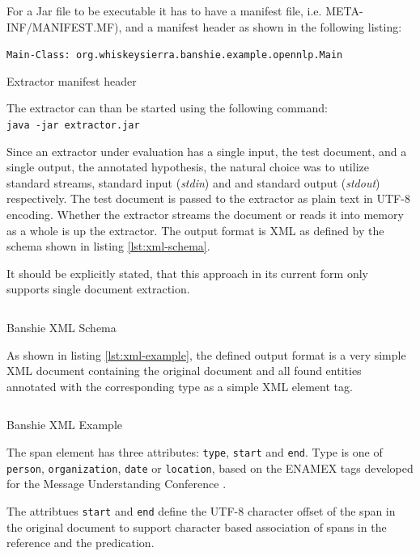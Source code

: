 For a Jar file to be executable it has to have a manifest file, i.e. META-INF/MANIFEST.MF), and a manifest header as shown in the following listing:

\begin{listing}[H]
\texttt{Main-Class: org.whiskeysierra.banshie.example.opennlp.Main}
\caption{Extractor manifest header}
\end{listing}

The extractor can than be started using the following command: \\ \texttt{java -jar extractor.jar}

Since an extractor under evaluation has a single input, the test document, and a single output, the annotated hypothesis, the natural choice was to utilize standard streams, standard input (\textit{stdin}) and and standard output (\textit{stdout}) respectively. The test document is passed to the extractor as plain text in UTF-8 encoding. Whether the extractor streams the document or reads it into memory as a whole is up the extractor. The output format is \gls{XML} as defined by the schema shown in listing \ref{lst:xml-schema}.

It should be explicitly stated, that this approach in its current form only supports single document extraction.

\begin{listing}[H]
\inputminted{xml}{../../../../../banshie-api/src/main/resources/schema.xsd}
\caption{Banshie XML Schema}
\label{lst:xml-schema}
\end{listing}

As shown in listing \ref{lst:xml-example}, the defined output format is a very simple XML document containing the original document and all found entities annotated with the corresponding type as a simple XML element tag.

\begin{listing}[H]
\inputminted{xml}{../../../../../banshie-api/src/main/resources/example.xml}
\caption{Banshie XML Example}
\label{lst:xml-example}
\end{listing}

The span element has three attributes: \texttt{type}, \texttt{start} and \texttt{end}. Type is one of \texttt{person}, \texttt{organization}, \texttt{date} or \texttt{location}, based on the ENAMEX tags developed for the Message Understanding Conference \cite{Grishman:1996}.

The attribtues \texttt{start} and \texttt{end} define the UTF-8 character offset of the span in the original document to support character based association of spans in the reference and the predication.

